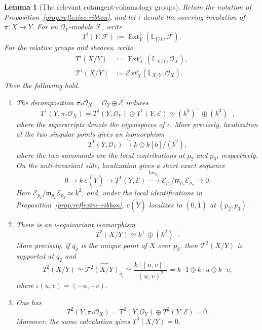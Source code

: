 \documentclass[11pt,twoside]{amsart}
\theoremstyle{plain}
\numberwithin{equation}{section}
\newtheorem{lemma}[theorem]{Lemma}
\theoremstyle{definition}
\newcommand{\Ext}{\operatorname{Ext}}
\begin{document}
\begin{lemma}[The relevant cotangent-cohomology groups]
\label{lem:cotangent-groups-bicanonical-cover}
Retain the notation of Proposition~\ref{prop:reflexive-ribbon}, and let
$\iota$ denote the covering involution of $\pi:X\to Y$. For an
$\mathcal O_Y$-module $\mathcal F$, write
$$
T^i(Y,\mathcal F)
:=\Ext^i_Y(\mathbb L_{Y/k},\mathcal F).
$$
For the relative groups and sheaves, write
$$
\begin{aligned}
T^i(X/Y)&:=\Ext^i_X(\mathbb L_{X/Y},\mathcal O_X),\\
\mathcal T^i(X/Y)&:=
\mathcal E xt^i_X(\mathbb L_{X/Y},\mathcal O_X).
\end{aligned}
$$
Then the following hold.

\begin{enumerate}
\item The decomposition
$\pi_*\mathcal O_X=\mathcal O_Y\oplus\mathcal E$ induces
$$
T^1(Y,\pi_*\mathcal O_X)
=T^1(Y,\mathcal O_Y)\oplus T^1(Y,\mathcal E)
\simeq (k^3)^+\oplus (k^3)^-,
$$
where the superscripts denote the eigenspaces of $\iota$. More precisely,
localization at the two singular points gives an isomorphism
$$
T^1(Y,\mathcal O_Y)
\xrightarrow{\ \sim\ }
k\oplus k[b]/(b^2),
$$
where the two summands are the local contributions at $p_2$ and $p_3$,
respectively. On the anti-invariant side, localization gives a short exact
sequence
$$
0\longrightarrow k\,e(\widetilde Y)
\longrightarrow T^1(Y,\mathcal E)
\xrightarrow{\ \operatorname{loc}_{p_2}\ }
\mathcal E_{p_2}/\mathfrak m_{p_2}\mathcal E_{p_2}
\longrightarrow0.
$$
Here $\mathcal E_{p_2}/\mathfrak m_{p_2}\mathcal E_{p_2}\simeq k^2$, and,
under the local identifications in Proposition~\ref{prop:reflexive-ribbon},
$e(\widetilde Y)$ localizes to $(0,\overline 1)$ at $(p_2,p_3)$.

\item There is an $\iota$-equivariant isomorphism
$$
T^2(X/Y)\simeq k^+\oplus (k^2)^-.
$$
More precisely, if $q_2$ is the unique point of $X$ over $p_2$, then
$\mathcal T^2(X/Y)$ is supported at $q_2$ and
$$
T^2(X/Y)
\simeq
\widehat{\mathcal T^2(X/Y)_{q_2}}
\simeq
\frac{k[[u,v]]}{(u,v)^2}
=k\cdot1\oplus k\cdot u\oplus k\cdot v,
$$
where $\iota(u,v)=(-u,-v)$.

\item One has
$$
T^2(Y,\pi_*\mathcal O_X)
=T^2(Y,\mathcal O_Y)\oplus T^2(Y,\mathcal E)=0.
$$
Moreover, the same calculation gives $T^3(X/Y)=0$.
\end{enumerate}
\end{lemma}
\end{document}
